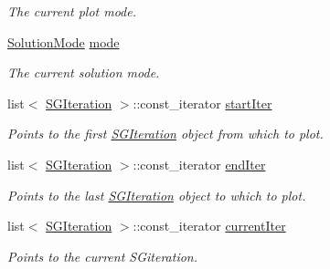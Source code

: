 \begin{DoxyCompactItemize}
\begin{DoxyCompactList}\small\item\em The current plot mode. \end{DoxyCompactList}\item 
\mbox{\label{classSGPlotController_a8fdf83cc3dcef50537e142e7f8905668}} 
\hyperlink{classSGPlotController_a7b1cebc57af82edfcbd1d2841ffad95c}{Solution\+Mode} \hyperlink{classSGPlotController_a8fdf83cc3dcef50537e142e7f8905668}{mode}
\begin{DoxyCompactList}\small\item\em The current solution mode. \end{DoxyCompactList}\item 
\mbox{\label{classSGPlotController_ae8f9f11e6f060c818603935a3c71e6f9}} 
list$<$ \hyperlink{classSGIteration}{S\+G\+Iteration} $>$\+::const\+\_\+iterator \hyperlink{classSGPlotController_ae8f9f11e6f060c818603935a3c71e6f9}{start\+Iter}
\begin{DoxyCompactList}\small\item\em Points to the first \hyperlink{classSGIteration}{S\+G\+Iteration} object from which to plot. \end{DoxyCompactList}\item 
\mbox{\label{classSGPlotController_afbca0fc2e4ecd8dae64559697b78ef91}} 
list$<$ \hyperlink{classSGIteration}{S\+G\+Iteration} $>$\+::const\+\_\+iterator \hyperlink{classSGPlotController_afbca0fc2e4ecd8dae64559697b78ef91}{end\+Iter}
\begin{DoxyCompactList}\small\item\em Points to the last \hyperlink{classSGIteration}{S\+G\+Iteration} object to which to plot. \end{DoxyCompactList}\item 
\mbox{\label{classSGPlotController_a4a174717197d238b483488a72f11e1eb}} 
list$<$ \hyperlink{classSGIteration}{S\+G\+Iteration} $>$\+::const\+\_\+iterator \hyperlink{classSGPlotController_a4a174717197d238b483488a72f11e1eb}{current\+Iter}
\begin{DoxyCompactList}\small\item\em Points to the current S\+Giteration. \end{DoxyCompactList}\item 

\end{DoxyCompactItemize}
